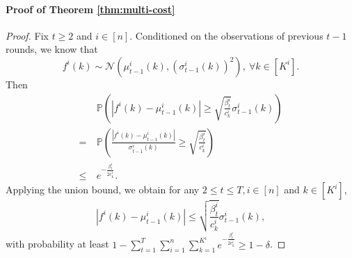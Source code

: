 \documentclass[letterpaper]{vldb}
\newcommand{\cN}{\mathcal{N}}
\newcommand{\bP}{\mathbb{P}} %
\begin{document}
\vspace{2em}
\paragraph*{Proof of Theorem \ref{thm:multi-cost}}
\begin{proof}
  Fix $t\ge 2$ and $i\in [n]$. Conditioned on the observations of previous $t-1$ rounds, we
  know that 
  \[
    f^i(k) \sim \cN(\mu^i_{t-1}(k), (\sigma^i_{t-1}(k))^2), \ \forall k\in [K^i].
  \]
  Then
  \begin{align*}
    & \bP\left(|f^i(k)- \mu^i_{t-1}(k)| \ge \sqrt{\frac{\beta^i_t}{c^i_k}}\sigma^i_{t-1}(k)\right)\\
    =\ & \bP\left(\frac{|f^i(k)- \mu^i_{t-1}(k)|}{\sigma^i_{t-1}(k)} \ge \sqrt{\frac{\beta^i_t}{c^i_k}}\right)\\
    \le\ & e^{-\frac{\beta^i_t}{2c^i_k}}.
  \end{align*}
  Applying the union bound, we obtain for any $2\le t\le T, i\in [n]$ and $k\in [K^i]$,
  \[
    |f^i(k) - \mu^i_{t-1}(k) | \le \sqrt{\frac{\beta_t^i}{c^i_k}}\sigma^i_{t-1}(k),
  \]
  with probability at least $1- \sum_{t=1}^T\sum_{i=1}^n\sum_{k=1}^{K^i}
  e^{-\frac{\beta^i_t}{2c^i_k}} \ge  1 - \delta$.
 

\end{proof}
\end{document}
